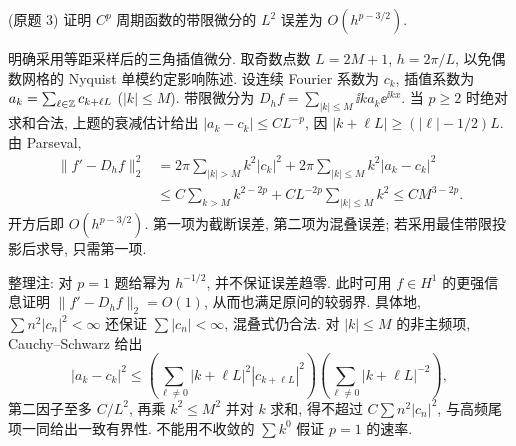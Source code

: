 \begin{exercise}\label{ps8-q3}
(原题 3) 证明 $C^p$ 周期函数的带限微分的 $L^2$ 误差为 $O(h^{p-3/2})$.
\end{exercise}
\begin{solution}
明确采用等距采样后的三角插值微分. 取奇数点数 $L=2M+1$, $h=2\pi/L$, 以免偶数网格的 Nyquist 单模约定影响陈述. 设连续 Fourier 系数为 $c_k$, 插值系数为
$a_k=\sum_{\ell\in\mathbb Z}c_{k+\ell L}$ ($|k|\le M$).
带限微分为 $D_hf=\sum_{|k|\le M}\ii k a_k\ee^{\ii kx}$.
当 $p\ge2$ 时绝对求和合法, 上题的衰减估计给出
$|a_k-c_k|\le C L^{-p}$, 因 $|k+\ell L|\ge (|\ell|-1/2)L$.
由 Parseval,
\[
\begin{split}
\|f'-D_hf\|_2^2
&=2\pi\sum_{|k|>M}k^2|c_k|^2
+2\pi\sum_{|k|\le M}k^2|a_k-c_k|^2\\
&\le C\sum_{k>M}k^{2-2p}+CL^{-2p}\sum_{|k|\le M}k^2
\le C M^{3-2p}.
\end{split}
\]
开方后即 $O(h^{p-3/2})$. 第一项为截断误差, 第二项为混叠误差; 若采用最佳带限投影后求导, 只需第一项.

整理注: 对 $p=1$ 题给幂为 $h^{-1/2}$, 并不保证误差趋零. 此时可用 $f\in H^1$ 的更强信息证明 $\|f'-D_hf\|_2=O(1)$, 从而也满足原问的较弱界. 具体地, $\sum n^2|c_n|^2<\infty$ 还保证 $\sum |c_n|<\infty$, 混叠式仍合法. 对 $|k|\le M$ 的非主频项, Cauchy--Schwarz 给出
\[
|a_k-c_k|^2\le
\left(\sum_{\ell\ne0}|k+\ell L|^2|c_{k+\ell L}|^2\right)
\left(\sum_{\ell\ne0}|k+\ell L|^{-2}\right),
\]
第二因子至多 $C/L^2$, 再乘 $k^2\le M^2$ 并对 $k$ 求和, 得不超过 $C\sum n^2|c_n|^2$, 与高频尾项一同给出一致有界性. 不能用不收敛的 $\sum k^0$ 假证 $p=1$ 的速率.
\end{solution}

